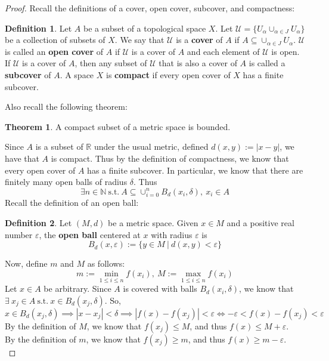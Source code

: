 \documentclass[12pt,letterpaper]{article}
\newcommand{\st}{\ \text{s.t.}\ }
\newcommand{\R}{\mathbb{R}}
\newcommand{\N}{\mathbb{N}}
\theoremstyle{case}
\theoremstyle{definition}
\newtheorem{definition*}{Definition}
\newtheorem*{theorem*}{Theorem}
\begin{document}
\begin{enumerate}
\begin{enumerate}
\begin{proof}
				Recall the definitions of a cover, open cover, subcover, and compactness:
				\theoremstyle{definition}
				\begin{definition*}
					Let $A$ be a subset of a topological space $X$. Let $\mathscr{U}=\{{U_\alpha}\cup_{\alpha \in J} U_\alpha\}$ be a collection of subsets of $X$. We say that $\mathscr{U}$ is a \textbf{cover} of $A$ if $A \subseteq \cup_{\alpha \in J} U_\alpha$. $\mathscr{U}$ is called an \textbf{open cover} of $A$ if $\mathscr{U}$ is a cover of $A$ and each element of $\mathscr{U}$ is open. If $\mathscr{U}$ is a cover of $A$, then any subset of $\mathscr{U}$ that is also a cover of $A$ is called a \textbf{subcover} of $A$. A space $X$ is \textbf{compact} if every open cover of $X$ has a finite subcover.
				\end{definition*}
				Also recall the following theorem:
				\begin{theorem*}
					A compact subset of a metric space is bounded.
				\end{theorem*}
				Since $A$ is a subset of $\R$ under the usual metric, defined $d(x,y):=|x-y|$, we have that $A$ is compact. Thus by the definition of compactness, we know that every open cover of $A$ has a finite subcover. In particular, we know that there are finitely many open balls of radius $\delta$. Thus
				\[\exists n \in \N \st A \subseteq \cup_{i=0}^n B_d(x_i, \delta),\ x_i \in A\]
				Recall the definition of an open ball:
				\theoremstyle{definition}
				\begin{definition*}
					Let $(M,d)$ be a metric space. Given $x \in M$ and a positive real number $\varepsilon$, the \textbf{open ball} centered at $x$ with radius $\varepsilon$ is
					\[B_d(x,\varepsilon) := \{y \in M\ |\ d(x,y)<\varepsilon\}\]
				\end{definition*}
				Now, define $m$ and $M$ as follows:
				\[m:= \min\limits_{1 \leq i \leq n} f(x_i),\ M:=\max\limits_{1 \leq i \leq n} f(x_i)\]
				Let $x \in A$ be arbitrary. Since $A$ is covered with balls $B_d(x_i,\delta)$, we know that $\exists\ x_j \in A \st x \in B_d(x_j, \delta)$.
				So,
				\[x \in B_d(x_j, \delta) \implies |x-x_j|<\delta \implies |f(x)-f(x_j)|<\varepsilon \iff -\varepsilon < f(x)-f(x_j)<\varepsilon\]
				By the definition of $M$, we know that $f(x_j) \leq M$, and thus $f(x)\leq M+\varepsilon$.\\
				
				By the definition of $m$, we know that $f(x_j) \geq m$, and thus $f(x) \geq m-\varepsilon$.\\
				

\end{proof}
\end{enumerate}
\end{enumerate}
\end{document}
